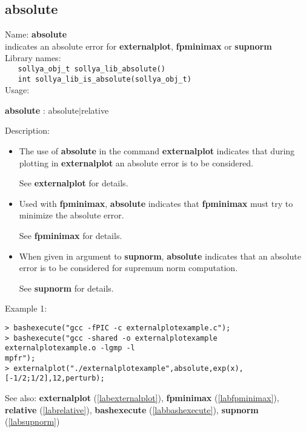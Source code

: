 \subsection{absolute}
\label{lababsolute}
\noindent Name: \textbf{absolute}\\
\phantom{aaa}indicates an absolute error for \textbf{externalplot}, \textbf{fpminimax} or \textbf{supnorm}\\[0.2cm]
\noindent Library names:\\
\verb|   sollya_obj_t sollya_lib_absolute()|\\
\verb|   int sollya_lib_is_absolute(sollya_obj_t)|\\[0.2cm]
\noindent Usage: 
\begin{center}
\textbf{absolute} : \textsf{absolute$|$relative}\\
\end{center}
\noindent Description: \begin{itemize}

\item The use of \textbf{absolute} in the command \textbf{externalplot} indicates that during
   plotting in \textbf{externalplot} an absolute error is to be considered.
    
   See \textbf{externalplot} for details.

\item Used with \textbf{fpminimax}, \textbf{absolute} indicates that \textbf{fpminimax} must try to minimize
   the absolute error.
    
   See \textbf{fpminimax} for details.

\item When given in argument to \textbf{supnorm}, \textbf{absolute} indicates that an absolute error
   is to be considered for supremum norm computation.
    
   See \textbf{supnorm} for details.
\end{itemize}
\noindent Example 1: 
\begin{center}\begin{minipage}{15cm}\begin{Verbatim}[frame=single]
> bashexecute("gcc -fPIC -c externalplotexample.c");
> bashexecute("gcc -shared -o externalplotexample externalplotexample.o -lgmp -l
mpfr");
> externalplot("./externalplotexample",absolute,exp(x),[-1/2;1/2],12,perturb);
\end{Verbatim}
\end{minipage}\end{center}
See also: \textbf{externalplot} (\ref{labexternalplot}), \textbf{fpminimax} (\ref{labfpminimax}), \textbf{relative} (\ref{labrelative}), \textbf{bashexecute} (\ref{labbashexecute}), \textbf{supnorm} (\ref{labsupnorm})
